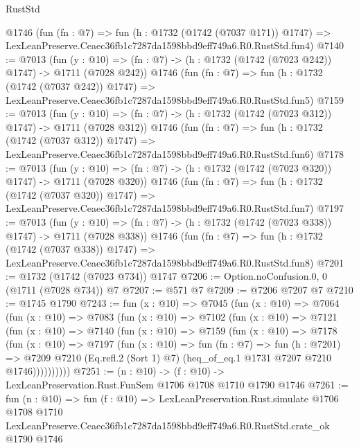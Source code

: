 \begin{lexlean}{RustStd}
\begin{coremodule}
    @1746
    (fun (fn : @7) =>
    fun (h : @1732 (@1742 (@7037 @171)) @1747) =>
    LexLeanPreserve.Ceaec36fb1c7287da1598bbd9eff749a6.R0.RustStd.fun4)
@7140 := @7013
    (fun (y : @10) => (fn : @7) -> (h : @1732 (@1742 (@7023 @242)) @1747) -> @1711 (@7028 @242))
    @1746
    (fun (fn : @7) =>
    fun (h : @1732 (@1742 (@7037 @242)) @1747) =>
    LexLeanPreserve.Ceaec36fb1c7287da1598bbd9eff749a6.R0.RustStd.fun5)
@7159 := @7013
    (fun (y : @10) => (fn : @7) -> (h : @1732 (@1742 (@7023 @312)) @1747) -> @1711 (@7028 @312))
    @1746
    (fun (fn : @7) =>
    fun (h : @1732 (@1742 (@7037 @312)) @1747) =>
    LexLeanPreserve.Ceaec36fb1c7287da1598bbd9eff749a6.R0.RustStd.fun6)
@7178 := @7013
    (fun (y : @10) => (fn : @7) -> (h : @1732 (@1742 (@7023 @320)) @1747) -> @1711 (@7028 @320))
    @1746
    (fun (fn : @7) =>
    fun (h : @1732 (@1742 (@7037 @320)) @1747) =>
    LexLeanPreserve.Ceaec36fb1c7287da1598bbd9eff749a6.R0.RustStd.fun7)
@7197 := @7013
    (fun (y : @10) => (fn : @7) -> (h : @1732 (@1742 (@7023 @338)) @1747) -> @1711 (@7028 @338))
    @1746
    (fun (fn : @7) =>
    fun (h : @1732 (@1742 (@7037 @338)) @1747) =>
    LexLeanPreserve.Ceaec36fb1c7287da1598bbd9eff749a6.R0.RustStd.fun8)
@7201 := @1732 (@1742 (@7023 @734)) @1747
@7206 := Option.noConfusion.{0, 0} (@1711 (@7028 @734)) @7
@7207 := @571 @7
@7209 := @7206 @7207 @7
@7210 := @1745 @1790
@7243 := fun (x : @10) =>
  @7045
    (fun (x : @10) =>
    @7064
      (fun (x : @10) =>
      @7083
        (fun (x : @10) =>
        @7102
          (fun (x : @10) =>
          @7121
            (fun (x : @10) =>
            @7140
              (fun (x : @10) =>
              @7159
                (fun (x : @10) =>
                @7178
                  (fun (x : @10) =>
                  @7197
                    (fun (x : @10) =>
                    fun (fn : @7) =>
                    fun (h : @7201) =>
                    @7209
                      @7210
                      (Eq.refl.{2} (Sort 1) @7)
                      (heq_of_eq.{1} @1731 @7207 @7210 @1746))))))))))
@7251 := (n : @10) -> (f : @10) -> LexLeanPreservation.Rust.FunSem @1706 @1708 @1710 @1790 @1746
@7261 := fun (n : @10) =>
  fun (f : @10) =>
  LexLeanPreservation.Rust.simulate
    @1706
    @1708
    @1710
    LexLeanPreserve.Ceaec36fb1c7287da1598bbd9eff749a6.R0.RustStd.crate_ok
    @1790
    @1746
\end{coremodule}
\end{lexlean}
